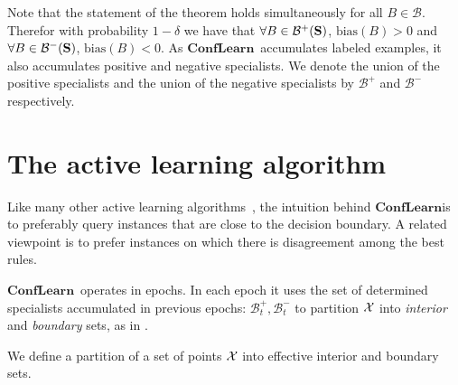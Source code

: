 \documentclass{article}
\newcommand{\cB}{\mathcal{B}}
\newcommand{\bias}{\text{bias}}
\newcommand{\ActiveLearn}{$\mathbf{ConfLearn}$}
\newcommand{\universe}[1]{{\cal #1}}
\begin{document}
Note that the statement of the theorem holds simultaneously for all $B \in
\cB$. Therefor with probability $1-\delta$ we have that $\forall B \in
\cB^{+} (\sample{S})$, $\bias(B)>0$ and $\forall B \in \cB^{-}
(\sample{S})$, $\bias(B)<0$. As \ActiveLearn\ accumulates labeled
examples, it also accumulates positive and negative specialists. We
denote the union of the positive specialists and the union of the negative
specialists by $\cB^+$ and $\cB^-$ respectively.


\section{The active learning algorithm}

\newcommand{\conform}{{\cal C}}
\newcommand{\nonconform}{{\cal N}}
\newcommand{\cover}{{\cal M}}
Like many other active learning algorithms~\cite{}, the intuition
behind \ActiveLearn is to preferably query instances that are close
to the decision boundary. A related viewpoint is to prefer instances
on which there is disagreement among the best rules.

\ActiveLearn\ operates in epochs. In each epoch it uses the set of
determined specialists accumulated in previous epochs:
$\cB^+_t,\cB^-_t$ to partition $\universe{X}$ into {\em interior} and
{\em boundary} sets, as in \cite{ChadhuriDasgupta2015}. 

We define a partition of a set of points $\universe{X}$ into effective
interior and boundary sets. 

\newcommand{\algInterior}{{\cal C}}
\newcommand{\algBoundary}{{\cal N}}
\newcommand{\algCover}{{\cal M}}
\end{document}
